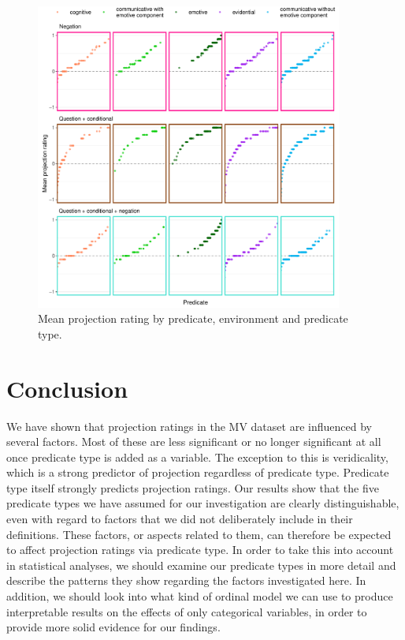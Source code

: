 \documentclass[11pt,fleqn]{article}
\newcommand{\6}{\mbox{$[\hspace*{-.6mm}[$}}
\newcommand{\9}{\mbox{$]\hspace*{-.6mm}]$}}
\begin{document}
\begin{figure}[H]
	\centering
	\includegraphics[width=0.9\textwidth]{projection-by-predicateType-and-environment-faceted}
	\caption{Mean projection rating by predicate, environment and predicate type.}
	\label{projpredtypeenvfac}
\end{figure}

\section{Conclusion}
We have shown that projection ratings in the MV dataset are influenced by several factors. Most of these are less significant or no longer significant at all once predicate type is added as a variable. The exception to this is veridicality, which is a strong predictor of projection regardless of predicate type. Predicate type itself strongly predicts projection ratings. Our results show that the five predicate types we have assumed for our investigation are clearly distinguishable, even with regard to factors that we did not deliberately include in their definitions. These factors, or aspects related to them, can therefore be expected to affect projection ratings via predicate type. In order to take this into account in statistical analyses, we should examine our predicate types in more detail and describe the patterns they show regarding the factors investigated here. In addition, we should look into what kind of ordinal model we can use to produce interpretable results on the effects of only categorical variables, in order to provide more solid evidence for our findings.




\end{document}
